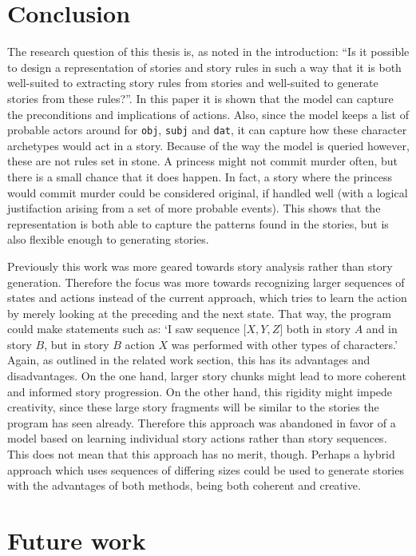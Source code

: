 \section{Conclusion}

The research question of this thesis is, as noted in the introduction: ``Is it possible to design a
representation of stories and story rules in such a way that it is both 
well-suited to extracting story rules from stories and well-suited to generate 
stories from these rules?''.
In this paper it is shown that the model can capture the preconditions and
implications of actions. Also, since the model keeps a list of probable actors
around for \texttt{obj}, \texttt{subj} and \texttt{dat},
it can capture how these character archetypes would act in a story. Because of the
way the model is queried however, these are not rules set in stone. A princess
might not commit murder often, but there is a small chance that it does happen. In
fact, a story where the princess would commit murder could be considered original, if
handled well (with a logical justifaction arising from a set of more probable
events). This shows that the representation is both able to capture the patterns
found in the stories, but is also flexible enough to generating stories.

Previously this work was more geared towards story analysis rather than story
generation. Therefore the focus was more towards recognizing larger sequences of
states and actions instead of the current approach, which tries to learn the
action by merely looking at the preceding and the next state. That way, the program could make statements
such as: `I saw sequence $ {[}X, Y, Z{]} $ both in story $A$ and in story $B$, but
in story $B$ action $X$ was performed with other types of characters.'
Again, as outlined in the related work
section, this has its advantages and disadvantages. On the one hand, larger story
chunks might lead to more coherent and informed story progression. On the other
hand, this rigidity might impede creativity, since these large story fragments
will be similar to the stories the program has seen already. Therefore this
approach was abandoned in favor of a model based on learning individual story
actions rather than story sequences. This does not mean that this approach has
no merit, though. Perhaps a hybrid approach which uses
sequences of differing sizes could be used to generate stories with the
advantages of both methods, being both coherent and creative.

\section{Future work}

